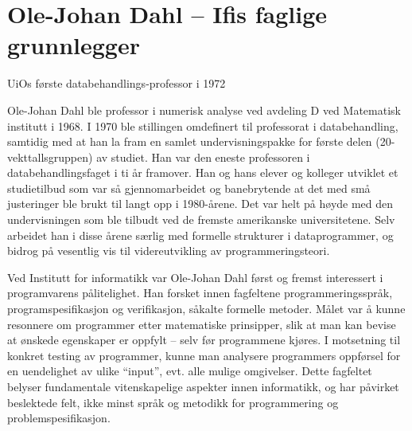\documentclass[../../main.tex]{subfiles}
\begin{document}
\chapter[Ole-Johan Dahl]{Ole-Johan Dahl – Ifis faglige grunnlegger}

\author{Av Narve Trædal}


UiOs første databehandlings-professor i 1972

Ole-Johan Dahl ble professor i numerisk analyse ved avdeling D ved Matematisk institutt i 1968. I 1970 ble stillingen omdefinert til professorat i databehandling, samtidig med at han la fram en samlet undervisningspakke for første delen (20-vekttallsgruppen) av studiet. Han var den eneste professoren i databehandlingsfaget i ti år framover. Han og hans elever og kolleger utviklet et studietilbud som var så gjennomarbeidet og banebrytende at det med små justeringer ble brukt til langt opp i 1980-årene. Det var helt på høyde med den undervisningen som ble tilbudt ved de fremste amerikanske universitetene. Selv arbeidet han i disse årene særlig med formelle strukturer i dataprogrammer, og bidrog på vesentlig vis til videreutvikling av programmeringsteori.

Ved Institutt for informatikk var Ole-Johan Dahl først og fremst interessert i programvarens pålitelighet. Han forsket innen fagfeltene programmeringsspråk, programspesifikasjon og verifikasjon, såkalte formelle metoder. Målet var å kunne resonnere om programmer etter matematiske prinsipper, slik at man kan bevise at ønskede egenskaper er oppfylt – selv før programmene kjøres. I motsetning til konkret testing av programmer, kunne man analysere programmers oppførsel for en uendelighet av ulike ``input'', evt. alle mulige omgivelser. Dette fagfeltet belyser fundamentale vitenskapelige aspekter innen informatikk, og har påvirket beslektede felt, ikke minst språk og metodikk for programmering og problemspesifikasjon.
\end{document}
